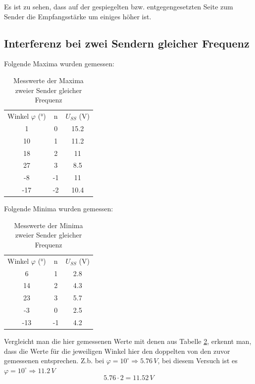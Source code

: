 \documentclass[
  headings=optiontotocandhead,
  twoside,
  openright,
  numbers=noenddot,
  toc=flat,
  11pt,
  parskip=full,
  listof=flat,
  bibliography=totoc,
  a4paper,
  DIV=14,
  BCOR=22mm,
  headheight=5mm,
  headinclude=true,
]{scrartcl}
\begin{document}
Es ist zu sehen, dass auf der gespiegelten bzw. entgegengesetzten Seite zum Sender die Empfangsstärke um einiges höher ist.

\subsection{Interferenz bei zwei Sendern gleicher Frequenz}

Folgende Maxima wurden gemessen:

\begin{table}[H]
  \centering
  \setlength{\tabcolsep}{10pt}
  \begin{tabular}{ |c|c|c| }
    \multicolumn{1}{c}{Winkel $\varphi$ (°)} & \multicolumn{1}{c}{n} & \multicolumn{1}{c}{$U_{SS}$ (V)} \\
    1 & 0 & 15.2 \\
    10 & 1 & 11.2 \\
    18 & 2 & 11 \\
    27 & 3 & 8.5 \\
    -8 & -1 & 11 \\
    -17 & -2 & 10.4 \\
  \end{tabular}
  \caption{Messwerte der Maxima zweier Sender gleicher Frequenz}
  \label{tab:doppelspalt1}
\end{table}

Folgende Minima wurden gemessen:

\begin{table}[H]
  \centering
  \setlength{\tabcolsep}{10pt}
  \begin{tabular}{ |c|c|c| }
    \multicolumn{1}{c}{Winkel $\varphi$ (°)} & \multicolumn{1}{c}{n} & \multicolumn{1}{c}{$U_{SS}$ (V)} \\
    6 & 1 & 2.8 \\
    14 & 2 & 4.3 \\
    23 & 3 & 5.7 \\
    -3 & 0 & 2.5 \\
    -13 & -1 & 4.2 \\
  \end{tabular}
  \caption{Messwerte der Minima zweier Sender gleicher Frequenz}
  \label{tab:doppelspalt1}
\end{table}

Vergleicht man die hier gemessenen Werte mit denen aus Tabelle \ref{tab:doppelspalt1}, erkennt man, dass die Werte für die jeweiligen Winkel hier den doppelten von den zuvor gemessenen entsprechen. Z.b. bei $\varphi = 10^\circ \Rightarrow 5.76\, V$, bei diesem Versuch ist es $\varphi = 10^\circ \Rightarrow 11.2\, V$
$$ 5.76 \cdot 2 = 11.52 \, V $$
\end{document}
